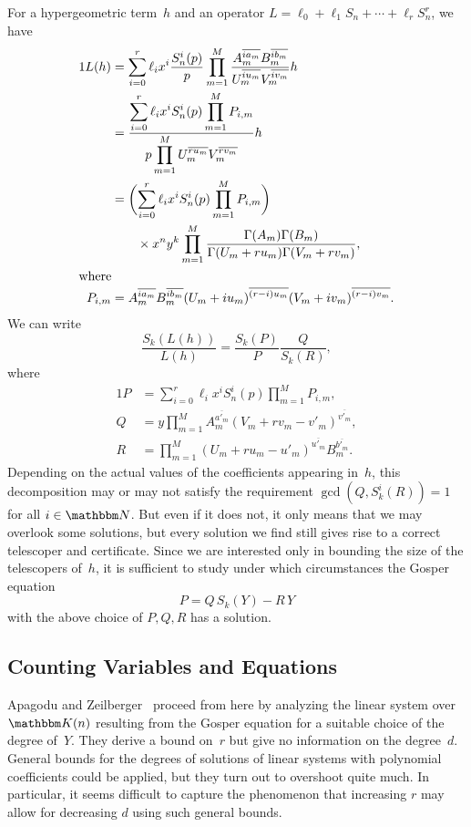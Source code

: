 \documentclass{sig-alternate}
\let\set\mathbbm
\def\K{\set K}
\def\rf#1#2{#1^{\overline{#2}}}
\begin{document}
For a hypergeometric term~$h$ and an operator $L=\ell_0+\ell_1
S_n+\cdots+\ell_r S_n^r$, we have {\allowdisplaybreaks
\begin{alignat*}1
  L(h)&=\sum_{i=0}^r \ell_i x^i \frac{S_n^i(p)}p \prod_{m=1}^M \frac{\rf{A_m}{ia_m}\rf{B_m}{ib_m}}{\rf{U_m}{iu_m}\rf{V_m}{iv_m}} h\\
   &= \frac{\displaystyle\sum\limits_{i=0}^r \ell_i x^i S_n^i(p) \prod\limits_{m=1}^M {P_{i, m}}}
           {\displaystyle p\prod_{m=1}^M\rf{U_m}{ru_m}\rf{V_m}{rv_m}} h\\
   &=\biggl(\sum_{i=0}^r \ell_i x^i S_n^i(p) \prod\limits_{m=1}^M {P_{i, m}} \biggr)\\
   &\qquad{}\times x^n y^k \prod_{m=1}^M \frac{\Gamma(A_m)\Gamma(B_m)}{\Gamma(U_m+ru_m)\Gamma(V_m+rv_m)},\\
\intertext{where}
  P_{i,m}&=\rf{A_m}{ia_m}\rf{B_m}{ib_m}\rf{(U_m+iu_m)}{(r-i)u_m}\rf{(V_m+iv_m)}{(r-i)v_m}.
\end{alignat*}}We can write
\[
  \frac{S_k(L(h))}{L(h)}=\frac{S_k(P)}{P}\frac{Q}{S_k(R)},
\]
where
\begin{alignat*}1
   P &= \sum_{i=0}^r \ell_i x^i S_n^i(p) \prod\limits_{m=1}^M {P_{i, m}},\\
   Q &= y \prod_{m=1}^M \rf{A_m}{a'_m}\rf{(V_m+rv_m-v'_m)}{v'_m}, \\
   R &= \prod_{m=1}^M \rf{(U_m+ru_m-u'_m)}{u'_m}\rf{B_m}{b'_m}.
\end{alignat*}
Depending on the actual values of the coefficients appearing in~$h$, this decomposition may or may not
satisfy the requirement $\gcd(Q,S_k^i(R))=1$ for all $i\in\set N$. But even if
it does not, it only means that we may overlook some solutions, but every
solution we find still gives rise to a correct telescoper and
certificate. Since we are interested only in bounding the size of the
telescopers of~$h$, it is sufficient to study under which circumstances the
Gosper equation
\[
  P = Q\,S_k(Y) - R\,Y
\]
with the above choice of $P,Q,R$ has a solution.

\subsection{Counting Variables and Equations}

Apagodu and Zeilberger~\cite{mohammed05} proceed from here by analyzing the linear system over
$\K(n)$ resulting from the Gosper equation for a suitable choice of the degree
of~$Y$. They derive a bound on~$r$ but give no information on the
degree~$d$. General bounds for the degrees of solutions of linear systems with
polynomial coefficients could be applied, but they turn out to overshoot quite
much. In particular, it seems difficult to capture the phenomenon that increasing $r$
may allow for decreasing $d$ using such general bounds.
\end{document}
